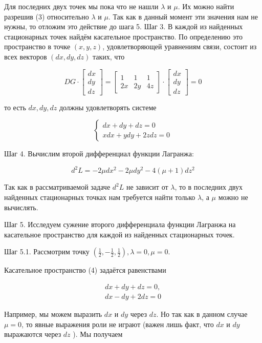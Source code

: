 \documentclass[a4paper,12pt]{article} %
\begin{document}
Для последних двух точек мы пока что не нашли $\lambda$ и $\mu$. Их можно найти разрешив (3) относительно $\lambda$ и $\mu$. Так как в данный момент эти значения нам не нужны, то отложим это действие до шага 5. Шаг 3. В каждой из найденных стационарных точек найдём касательное пространство. По определению это пространство в точке $(x, y, z)$, удовлетворяющей уравнениям связи, состоит из всех векторов $(d x, d y, d z)$ таких, что

$$
D G \cdot\left[\begin{array}{l}
d x \\
d y \\
d z
\end{array}\right]=\left[\begin{array}{ccc}
1 & 1 & 1 \\
2 x & 2 y & 4 z
\end{array}\right] \cdot\left[\begin{array}{l}
d x \\
d y \\
d z
\end{array}\right]=0
$$

то есть $d x, d y, d z$ должны удовлетворять системе

$$
\left\{\begin{array}{l}
d x+d y+d z=0 \\
x d x+y d y+2 z d z=0
\end{array}\right.
$$

Шаг 4. Вычислим второй дифференциал функции Лагранжа:

$$
d^{2} L=-2 \mu d x^{2}-2 \mu d y^{2}-4(\mu+1) d z^{2}
$$

Так как в рассматриваемой задаче $d^{2} L$ не зависит от $\lambda$, то в последних двух найденных стационарных точках нам требуется найти только $\lambda$, а $\mu$ можно не вычислять.

Шаг 5. Исследуем сужение второго дифференциала функции Лагранжа на касательное пространство для каждой из найденных стационарных точек.

Шаг 5.1. Рассмотрим точку $\left(\frac{1}{2},-\frac{1}{2}, \frac{1}{2}\right), \lambda=0, \mu=0$.

Касательное пространство (4) задаётся равенствами

$$
\begin{gathered}
d x+d y+d z=0, \\
d x-d y+2 d z=0
\end{gathered}
$$

Например, мы можем выразить $d x$ и $d y$ через $d z$. Но так как в данном случае $\mu=0$, то явные выражения роли не играют (важен лишь факт, что $d x$ и $d y$ выражаются через $d z$ ). Мы получаем
\end{document}
